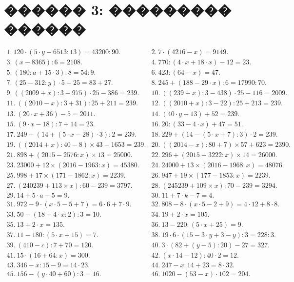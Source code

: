 \documentclass[12pt]{article}
\begin{document}
\section{������ 3: ��������� ������}
$\begin{array}{ll}
1.\ 120\cdot(5\cdot y-6513:13)=43200:90.&
2.\ 7\cdot(4216-x)=9149.\\
3.\ (x-8365):6=2108.&
4.\ 770:(4\cdot x+18\cdot x)-12=23.\\
5.\ (180:a+15\cdot3):8=54:9.&
6.\ 423:(64-x)=47.\\
7.\ (25-312:y)\cdot5+25=83+27.&
8.\ 245+(188-29\cdot x):6=17990:70.\\
9.\ ((2009+x):3-975)\cdot25-386=239.&
10.\ ((239+x):3-438)\cdot25-116=2009.\\
11.\ ((2010-x):3+31):25+211=239.&
12.\ ((2010+x):3-22):25+213=239.\\
13.\ (20\cdot x+36)-5=2011.&
14.\ (40\cdot y-13)+52=239.\\
15.\ (9\cdot x-18):7+14=23.&
16.\ 20:(33-4\cdot x)+47=51.\\
17.\ 249-(14+(5\cdot x-28)\cdot 3):2=239.&
18.\ 229+(14-(5\cdot x+7):3)\cdot2=239.\\
19.\ ((2014+x):40-8)\times43-1653=239.&
20.\ ((2014-x):80+7)\times57+623=2390.\\
21.\ 898+(2015-2576:x)\times 13=25000.&
22.\ 296+(2015-3222:x)\times 14=26000.\\
23.\ 23000+12\times (2016-1963:x)=45380.&
24.\ 24000+13\times(2016-1968:x)=48076.\\
25.\ 998+17\times(171-1862:x)=2239.&
26.\ 947+19\times(177-1853:x)=2239.\\
27.\ (240239+113\times x):60-239=3797.&
28.\ (245239+109\times x):70-239=3294.\\
29.\ 14+5\cdot a-5=9.&
30.\ 11+7\cdot k-7=4.\\
31.\ 972-9\cdot(x\cdot 5-5+7)=6\cdot6+7\cdot9.&
32.\ 808-8\cdot(x\cdot5-2+9)=4\cdot12+8\cdot8.\\
33.\ 50-(18+4\cdot x:2):3=10.&
34.\ 19+2\cdot x=105.\\
35.\ 13+2\cdot x=135.&
36.\ 13-220:(5\cdot x+25)=9.\\
37.\ 11-180:(5\cdot x+15)=7.&
38.\ 19\cdot6\cdot(15-3\cdot y+3-y):3=228:3.\\
39.\ (410-c):7+70=120.&
40.\ 3\cdot(82+(y-5):20)-27=327.\\
41.\ 15\cdot(16+64:x)=300.&
42.\ (x\cdot14-12):40\cdot2=12.\\
43.\ 346-x:15-9=14\cdot23.&
44.\ 247-x:14+23=8\cdot32.\\
45.\ 156-(y\cdot40+60):3=16.&
46.\ 1020-(53-x)\cdot102=204.\end{array}$\\
\end{document}
